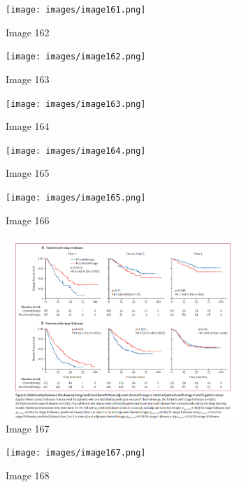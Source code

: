 \documentclass{article}%
\begin{document}
%


\begin{figure}[h!]%
\centering%
\texttt{[image: images/image161.png]}%
\caption{Image 162}%
\end{figure}

%


\begin{figure}[h!]%
\centering%
\texttt{[image: images/image162.png]}%
\caption{Image 163}%
\end{figure}

%


\begin{figure}[h!]%
\centering%
\texttt{[image: images/image163.png]}%
\caption{Image 164}%
\end{figure}

%


\begin{figure}[h!]%
\centering%
\texttt{[image: images/image164.png]}%
\caption{Image 165}%
\end{figure}

%


\begin{figure}[h!]%
\centering%
\texttt{[image: images/image165.png]}%
\caption{Image 166}%
\end{figure}

%


\begin{figure}[h!]%
\centering%
\includegraphics[width=0.8\textwidth]{images/image166.png}%
\caption{Image 167}%
\end{figure}

%


\begin{figure}[h!]%
\centering%
\texttt{[image: images/image167.png]}%
\caption{Image 168}%
\end{figure}
\end{document}
